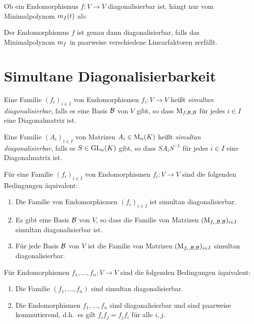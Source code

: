 
Ob ein Endomorphismus $f \colon V \to V$ diagonalisierbar ist, hängt nur vom Minimalpolynom $m_{f}(t)$ ab:

\begin{proposition}
  Der Endomorphismus $f$ ist genau dann diagonalisierbar, falls das Minimalpolynom $m_{f}$ in paarweise verschiedene Linearfaktoren zerfällt.
\end{proposition}





\section{Simultane Diagonalisierbarkeit}

\begin{definition}
  Eine Familie $(f_i)_{i \in I}$ von Endomorphismen $f_i \colon V \to V$ heißt \emph{simultan diagonalisierbar}, falls es eine Basis $\mathcal{B}$ von $V$ gibt, so dass $\operatorname{M}_{f, \mathcal{B}, \mathcal{B}}$ für jedes $i \in I$ eine Diagonalmatrix ist.
  
  Eine Familie $(A_i)_{i \in I}$ von Matrizen $A_i \in \operatorname{M}_{n}(K)$ heißt \emph{simultan diagonalisierbar}, falls es $S \in \operatorname{GL}_{n}(K)$ gibt, so dass $S A_i S^{-1}$ für jedes $i \in I$ eine Diagonalmatrix ist.
\end{definition}

\begin{lemma}
  Für eine Familie $(f_i)_{i \in I}$ von Endomorphismen $f_i \colon V \to V$ sind die folgenden Bedingungen äquivalent:
  \begin{enumerate}
    \item
      Die Familie von Endomorphismen $(f_i)_{i \in I}$ ist simultan diagonalisierbar.
    \item
      Es gibt eine Basis $\mathcal{B}$ von $V$, so dass die Familie von Matrizen $(\operatorname{M}_{f_i, \mathcal{B}, \mathcal{B}})_{i \in I}$ simultan diagonalisierbar ist.
    \item
      Für jede Basis $\mathcal{B}$ von $V$ ist die Familie von Matrizen $(\operatorname{M}_{f_i, \mathcal{B}, \mathcal{B}})_{i \in I}$ simultan diagonalisierbar.
  \end{enumerate}
\end{lemma}

\begin{proposition}
  Für Endomorphismen $f_1, \dotsc, f_n \colon V \to V$ sind die folgenden Bedingungen äquivalent:
  \begin{enumerate}
    \item
      Die Familie $(f_1, \dotsc, f_n)$ sind simultan diagonalisierbar.
    \item
      Die Endomorphismen $f_1, \dotsc, f_n$ sind diagonalisierbar und sind paarweise kommutierend, d.h.\ es gilt $f_i f_j = f_j f_i$ für alle $i, j$.
  \end{enumerate}
\end{proposition}


